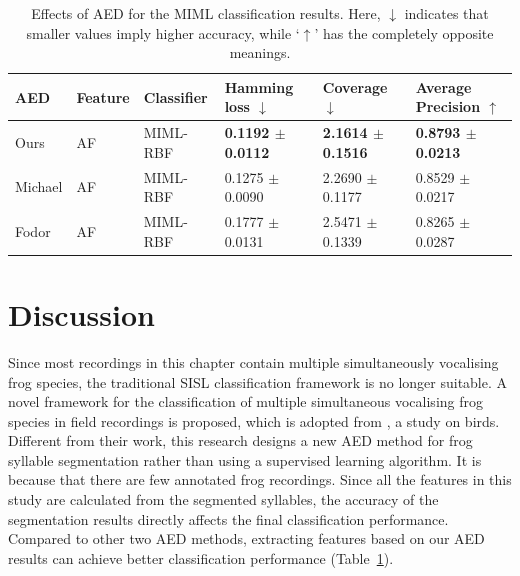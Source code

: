 \begin{table}[htb!]
\centering
\caption[Effects of AED for the MIML classification results]{Effects of AED for the MIML classification results. Here, $\downarrow$ indicates that smaller values imply higher accuracy, while ‘$\uparrow$’ has the completely opposite meanings.}
\label{Ch6:AEDCompare}
\begin{tabular}{llllll}
\hline\hline
AED     & Feature & Classifier & Hamming loss $\downarrow$ & Coverage $\downarrow$     & Average Precision  $\uparrow$\\ \hline
Ours    & AF      & MIML-RBF   & \textbf{0.1192 $\pm$ 0.0112} & \textbf{2.1614 $\pm$ 0.1516} & \textbf{0.8793 $\pm$ 0.0213}     \\ 
Michael & AF      & MIML-RBF   & 0.1275 $\pm$ 0.0090 & 2.2690 $\pm$ 0.1177 & 0.8529 $\pm$ 0.0217     \\ 
Fodor   & AF      & MIML-RBF   & 0.1777 $\pm$ 0.0131 & 2.5471 $\pm$ 0.1339 & 0.8265 $\pm$ 0.0287     \\ \hline\hline
\end{tabular}
\end{table}




\section{Discussion}
Since most recordings in this chapter contain multiple simultaneously vocalising frog species, the traditional SISL classification framework is no longer suitable. A novel framework for the classification of multiple simultaneous vocalising frog species in field recordings is proposed, which is adopted from \citep{briggs2012acoustic}, a study on birds. Different from their work, this research designs a new AED method for frog syllable segmentation rather than using a supervised learning algorithm. It is because that there are few annotated frog recordings. Since all the features in this study are calculated from the segmented syllables, the accuracy of the segmentation results directly affects the final classification performance. Compared to other two AED methods, extracting features based on our AED results can achieve better classification performance (Table~\ref{Ch6:AEDCompare}).

